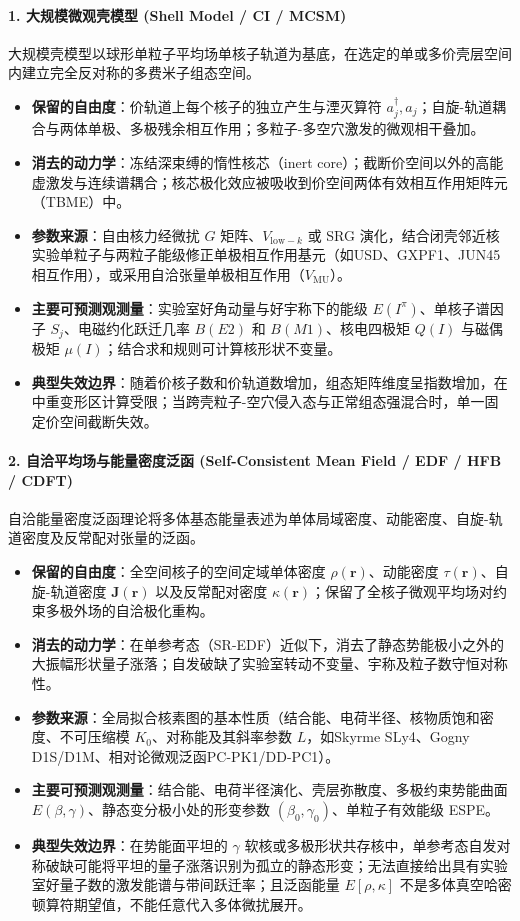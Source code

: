 \paragraph{1. 大规模微观壳模型 (Shell Model / CI / MCSM)}
大规模壳模型以球形单粒子平均场单核子轨道为基底，在选定的单或多价壳层空间内建立完全反对称的多费米子组态空间。
\begin{itemize}
\item \textbf{保留的自由度}：价轨道上每个核子的独立产生与湮灭算符 $a^\dagger_j, a_j$；自旋-轨道耦合与两体单极、多极残余相互作用；多粒子-多空穴激发的微观相干叠加。
\item \textbf{消去的动力学}：冻结深束缚的惰性核芯（inert core）；截断价空间以外的高能虚激发与连续谱耦合；核芯极化效应被吸收到价空间两体有效相互作用矩阵元（TBME）中。
\item \textbf{参数来源}：自由核力经微扰 $G$ 矩阵、$V_{\mathrm{low}-k}$ 或 SRG 演化，结合闭壳邻近核实验单粒子与两粒子能级修正单极相互作用基元（如USD、GXPF1、JUN45相互作用），或采用自洽张量单极相互作用（$V_{\mathrm{MU}}$）。\cite{doctoral-r1-g28-otsuka-2023-type-ii-shell-evolution}
\item \textbf{主要可预测观测量}：实验室好角动量与好宇称下的能级 $E(I^\pi)$、单核子谱因子 $S_j$、电磁约化跃迁几率 $B(E2)$ 和 $B(M1)$、核电四极矩 $Q(I)$ 与磁偶极矩 $\mu(I)$；结合求和规则可计算核形状不变量。
\item \textbf{典型失效边界}：随着价核子数和价轨道数增加，组态矩阵维度呈指数增加，在中重变形区计算受限；当跨壳粒子-空穴侵入态与正常组态强混合时，单一固定价空间截断失效。
\end{itemize}

\paragraph{2. 自洽平均场与能量密度泛函 (Self-Consistent Mean Field / EDF / HFB / CDFT)}
自洽能量密度泛函理论将多体基态能量表述为单体局域密度、动能密度、自旋-轨道密度及反常配对张量的泛函。
\begin{itemize}
\item \textbf{保留的自由度}：全空间核子的空间定域单体密度 $\rho(\mathbf{r})$、动能密度 $\tau(\mathbf{r})$、自旋-轨道密度 $\mathbf{J}(\mathbf{r})$ 以及反常配对密度 $\kappa(\mathbf{r})$；保留了全核子微观平均场对约束多极外场的自洽极化重构。
\item \textbf{消去的动力学}：在单参考态（SR-EDF）近似下，消去了静态势能极小之外的大振幅形状量子涨落；自发破缺了实验室转动不变量、宇称及粒子数守恒对称性。
\item \textbf{参数来源}：全局拟合核素图的基本性质（结合能、电荷半径、核物质饱和密度、不可压缩模 $K_0$、对称能及其斜率参数 $L$，如Skyrme SLy4、Gogny D1S/D1M、相对论微观泛函PC-PK1/DD-PC1）。
\item \textbf{主要可预测观测量}：结合能、电荷半径演化、壳层弥散度、多极约束势能曲面 $E(\beta, \gamma)$、静态变分极小处的形变参数 $(\beta_0, \gamma_0)$、单粒子有效能级 ESPE。
\item \textbf{典型失效边界}：在势能面平坦的 $\gamma$ 软核或多极形状共存核中，单参考态自发对称破缺可能将平坦的量子涨落识别为孤立的静态形变；无法直接给出具有实验室好量子数的激发能谱与带间跃迁率；且泛函能量 $E[\rho, \kappa]$ 不是多体真空哈密顿算符期望值，不能任意代入多体微扰展开。
\end{itemize}

